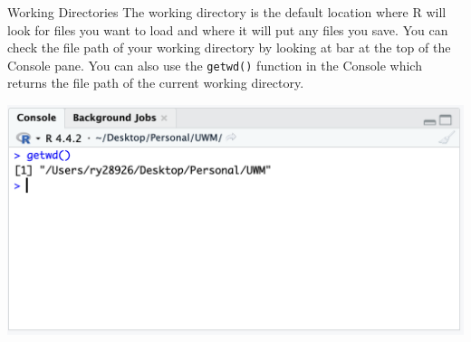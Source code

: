 \documentclass[aspectratio=169,xcolor=dvipsnames]{beamer}
\begin{document}
\begin{frame}{Working Directories}
The working directory is the default location where R will look for files you want to load and where it will put any files you save. You can check the file path of your working directory by looking at bar at the top of the Console pane. You can also use the \texttt{getwd()} function in the Console which returns the file path of the current working directory.
\begin{center}
\includegraphics[scale=0.5]{images/getwd.png}
\end{center}
\end{frame}
\end{document}
